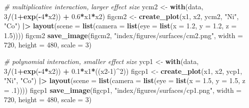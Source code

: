 \documentclass[12pt, twoside]{amherstthesis}
\newenvironment{Shaded}{\begin{snugshade}}{\end{snugshade}}
\newcommand{\AttributeTok}[1]{\textcolor[rgb]{0.13,0.29,0.53}{#1}}
\newcommand{\CommentTok}[1]{\textcolor[rgb]{0.56,0.35,0.01}{\textit{#1}}}
\newcommand{\DecValTok}[1]{\textcolor[rgb]{0.00,0.00,0.81}{#1}}
\newcommand{\FloatTok}[1]{\textcolor[rgb]{0.00,0.00,0.81}{#1}}
\newcommand{\FunctionTok}[1]{\textcolor[rgb]{0.13,0.29,0.53}{\textbf{#1}}}
\newcommand{\NormalTok}[1]{#1}
\newcommand{\OtherTok}[1]{\textcolor[rgb]{0.56,0.35,0.01}{#1}}
\newcommand{\SpecialCharTok}[1]{\textcolor[rgb]{0.81,0.36,0.00}{\textbf{#1}}}
\newcommand{\StringTok}[1]{\textcolor[rgb]{0.31,0.60,0.02}{#1}}
\begin{document}
\begin{Shaded}
\begin{Highlighting}[]
\CommentTok{\# multiplicative interaction, larger effect size}
\NormalTok{ycm2 }\OtherTok{\textless{}{-}} \FunctionTok{with}\NormalTok{(data, }\DecValTok{3}\SpecialCharTok{/}\NormalTok{(}\DecValTok{1}\SpecialCharTok{+}\FunctionTok{exp}\NormalTok{(}\SpecialCharTok{{-}}\DecValTok{4}\SpecialCharTok{*}\NormalTok{x2)) }\SpecialCharTok{+} \FloatTok{0.6}\SpecialCharTok{*}\NormalTok{x1}\SpecialCharTok{*}\NormalTok{x2) }
\NormalTok{figcm2 }\OtherTok{\textless{}{-}} \FunctionTok{create\_plot}\NormalTok{(x1, x2, ycm2, }\StringTok{"Ni"}\NormalTok{, }\StringTok{"Co"}\NormalTok{) }\SpecialCharTok{|\textgreater{}} 
  \FunctionTok{layout}\NormalTok{(}\AttributeTok{scene =} \FunctionTok{list}\NormalTok{(}\AttributeTok{camera =} \FunctionTok{list}\NormalTok{(}\AttributeTok{eye =} \FunctionTok{list}\NormalTok{(}\AttributeTok{x =} \FloatTok{1.2}\NormalTok{, }\AttributeTok{y =} \FloatTok{1.2}\NormalTok{, }\AttributeTok{z =} \FloatTok{1.5}\NormalTok{))))}
\NormalTok{figcm2}
\FunctionTok{save\_image}\NormalTok{(figcm2, }\StringTok{"index/figures/surfaces/cm2.png"}\NormalTok{, }
           \AttributeTok{width =} \DecValTok{720}\NormalTok{, }\AttributeTok{height =} \DecValTok{480}\NormalTok{, }\AttributeTok{scale =} \DecValTok{3}\NormalTok{)}

\CommentTok{\# polynomial interaction, smaller effect size}
\NormalTok{ycp1 }\OtherTok{\textless{}{-}} \FunctionTok{with}\NormalTok{(data, }\DecValTok{3}\SpecialCharTok{/}\NormalTok{(}\DecValTok{1}\SpecialCharTok{+}\FunctionTok{exp}\NormalTok{(}\SpecialCharTok{{-}}\DecValTok{4}\SpecialCharTok{*}\NormalTok{x2)) }\SpecialCharTok{+} \FloatTok{0.1}\SpecialCharTok{*}\NormalTok{x1}\SpecialCharTok{*}\NormalTok{((x2}\DecValTok{{-}1}\NormalTok{)}\SpecialCharTok{\^{}}\DecValTok{2}\NormalTok{))}
\NormalTok{figcp1 }\OtherTok{\textless{}{-}} \FunctionTok{create\_plot}\NormalTok{(x1, x2, ycp1, }\StringTok{"Ni"}\NormalTok{, }\StringTok{"Co"}\NormalTok{) }\SpecialCharTok{|\textgreater{}} 
  \FunctionTok{layout}\NormalTok{(}\AttributeTok{scene =} \FunctionTok{list}\NormalTok{(}\AttributeTok{camera =} \FunctionTok{list}\NormalTok{(}\AttributeTok{eye =} \FunctionTok{list}\NormalTok{(}\AttributeTok{x =} \FloatTok{1.5}\NormalTok{, }\AttributeTok{y =} \FloatTok{1.5}\NormalTok{, }\AttributeTok{z =}\NormalTok{ .}\DecValTok{1}\NormalTok{))))}
\NormalTok{figcp1}
\FunctionTok{save\_image}\NormalTok{(figcp1, }\StringTok{"index/figures/surfaces/cp1.png"}\NormalTok{, }
           \AttributeTok{width =} \DecValTok{720}\NormalTok{, }\AttributeTok{height =} \DecValTok{480}\NormalTok{, }\AttributeTok{scale =} \DecValTok{3}\NormalTok{)}


\end{Highlighting}
\end{Shaded}
\end{document}
